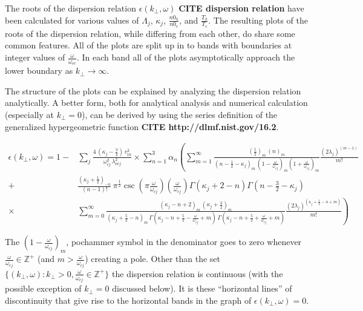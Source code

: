 \documentclass[12pt,a4paper]{article}
\begin{document}
    The roots of the dispersion relation $\epsilon(k_\perp, \omega)$ \textbf{CITE dispersion relation} have been calculated for various values of $\Lambda_j$, $\kappa_j$, $\frac{n0_h}{n0_e}$, and $\frac{T_h}{T_c}$.
    The resulting plots of the roots of the dispersion relation, while differing from each other, do share some common features.
    All of the plots are split up in to bands with boundaries at integer values of $\frac{\omega}{\omega_{ce}}$.
    In each band all of the plots asymptotically approach the lower boundary as $k_\perp \rightarrow \infty$.

    The structure of the plots can be explained by analyzing the dispersion relation analytically.
    A better form, both for analytical analysis and numerical calculation (especially at $k_\perp = 0$), can be derived by using the series definition of the generalized hypergeometric function \textbf{CITE http://dlmf.nist.gov/16.2}.

    \begin{align}
        \nonumber \epsilon(k_\perp, \omega) = 1 -& \sum_j \frac{4 \, (\kappa_j - \frac{3}{2}) \, v^2_{th}}{\omega^2_{cj} \, \lambda^2_{\nu c j}} \times \sum_{n = 1}^3 \alpha_n \left( \sum_{m = 1}^\infty \frac{ (\frac{1}{2})_m \, (n)_m }{(n - \frac{1}{2} - \kappa_j)_m \, (1 - \frac{\omega}{\omega_{cj}})_m (1 + \frac{\omega}{\omega_{cj}})_m } \frac{(2 \lambda_j)^{(m - 1)}}{m!} \right. \\
        \nonumber +& \left. \frac{(\kappa_j + \frac{1}{2})_{-n}}{(n - 1)!} \, \pi^{\frac{1}{2}} \csc\left(\pi \frac{\omega}{\omega_{cj}}\right) \left(\frac{\omega}{\omega_{cj}}\right) \Gamma(\kappa_j + 2 - n) \Gamma(n - \frac{3}{2} - \kappa_j) \right.\\
        \times& \left. \sum_{m = 0}^\infty \frac{(\kappa_j - n + 2)_m \, (\kappa_j + \frac{3}{2})_m}{(\kappa_j + \frac{5}{2} - n)_m \, \Gamma(\kappa_j - n + \frac{5}{2} - \frac{\omega}{\omega_{cj}} + m) \, \Gamma(\kappa_j - n + \frac{5}{2} + \frac{\omega}{\omega_{cj}} + m)} \frac{(2 \lambda_j)^{(\kappa_j + \frac{1}{2} - n + m)}}{m!} \right)
    \end{align}

    The $(1 - \frac{\omega}{\omega_{cj}})_m$, pochammer symbol in the denominator goes to zero whenever $\frac{\omega}{\omega_{cj}} \in \mathbb{Z}^+$ (and $m > \frac{\omega}{\omega_{cj}}$) creating a pole.
    Other than the set $\{(k_\perp, \omega) : k_\perp > 0, \frac{\omega}{\omega_{cj}} \in \mathbb{Z}^+\}$ the dispersion relation is continuous (with the possible exception of $k_\perp = 0$ discussed below).
    It is these ``horizontal lines'' of discontinuity that give rise to the horizontal bands in the graph of $\epsilon(k_\perp, \omega) = 0$.
\end{document}
